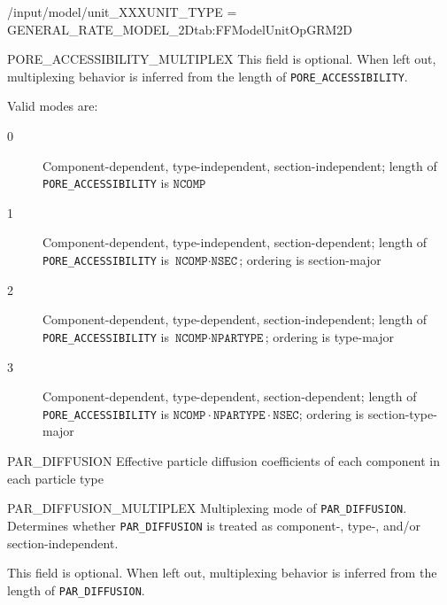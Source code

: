 \begin{condsubgroup}{/input/model/unit\_XXX}{UNIT\_TYPE = GENERAL\_RATE\_MODEL\_2D}{tab:FFModelUnitOpGRM2D}
\begin{dataset}[unit=--,type=int,range={$\{0, \dots, 3 \}$},length={1}]{PORE\_ACCESSIBILITY\_MULTIPLEX}
    This field is optional.
    When left out, multiplexing behavior is inferred from the length of \texttt{PORE\_ACCESSIBILITY}.

    Valid modes are:
    \begin{description}
      \item[0] Component-dependent, type-independent, section-independent; length of \texttt{PORE\_ACCESSIBILITY} is $\texttt{NCOMP}$
      \item[1] Component-dependent, type-independent, section-dependent; length of \texttt{PORE\_ACCESSIBILITY} is $\texttt{NCOMP} \cdot \texttt{NSEC}$; ordering is section-major
      \item[2] Component-dependent, type-dependent, section-independent; length of \texttt{PORE\_ACCESSIBILITY} is $\texttt{NCOMP} \cdot \texttt{NPARTYPE}$; ordering is type-major
      \item[3] Component-dependent, type-dependent, section-dependent; length of \texttt{PORE\_ACCESSIBILITY} is $\texttt{NCOMP} \cdot \texttt{NPARTYPE} \cdot \texttt{NSEC}$; ordering is section-type-major
    \end{description}\vspace{-\baselineskip}
  \end{dataset}
  \begin{dataset}[unit=\si{\square\metre\of{MP}\per\second},type=double,range={$\geq 0$},length={see \texttt{PAR\_DIFFUSION\_MULTIPLEX}}]{PAR\_DIFFUSION}
    Effective particle diffusion coefficients of each component in each particle type
  \end{dataset}
  \begin{dataset}[unit=--,type=int,range={$\{0, \dots, 3 \}$},length={1}]{PAR\_DIFFUSION\_MULTIPLEX}
    Multiplexing mode of \texttt{PAR\_DIFFUSION}.
    Determines whether \texttt{PAR\_DIFFUSION} is treated as component-, type-, and/or section-independent.

    This field is optional.
    When left out, multiplexing behavior is inferred from the length of \texttt{PAR\_DIFFUSION}.


\end{dataset}
\end{condsubgroup}
